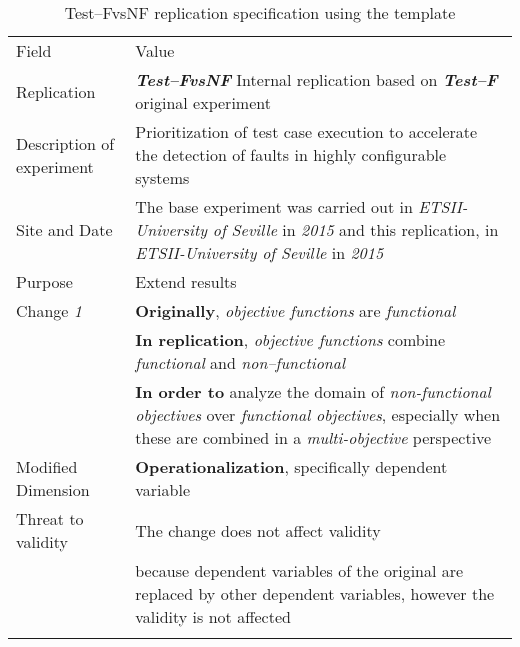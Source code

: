 \begin{table*}[h]
  \caption{Test--FvsNF replication specification using the template}
\label{tab:jap}
  \centering

\begin{tabularx}{\textwidth}{
  >{\hsize=0.25\hsize}X
  >{\hsize=0.8\hsize}X}
  
    \noalign{\smallskip}\hline\noalign{\smallskip}
  
  Field &  Value  \\ 
  \noalign{\smallskip}\hline\noalign{\smallskip}
 
 Replication &   \textbf{\emph{Test--FvsNF}}   Internal replication based on \textbf{\emph{Test--F}}  original experiment   \\

 Description \newline of experiment &  Prioritization of test case execution to accelerate the detection of faults in highly configurable systems \\  
 
 Site and Date & The  base  experiment  was  carried  out  in \textit{ETSII-University of Seville} in \textit{2015} and this replication, in \textit{ETSII-University of Seville} in \textit{2015}  \\
    Purpose  &  Extend results \\  
\hline   
    Change \textit{1}   & \textbf{Originally}, \emph{objective functions} are \emph{functional} \\ & \textbf{In replication},  \emph{objective functions} combine \emph{functional} and \emph{non--functional } \\& \textbf{In order to} analyze the domain of \emph{non-functional objectives} over \emph{functional objectives}, especially when these are combined in a \emph{multi-objective} perspective \\ 
    
    Modified Dimension & 
    \textbf{Operationalization}, specifically dependent variable \\   
    Threat to validity  &  The change does not affect validity \\
    & because dependent variables of the original are replaced by other dependent variables, however the validity is not affected \\ 
	
   	\noalign{\smallskip\smallskip}\hline
	\end{tabularx}  
\end{table*}
